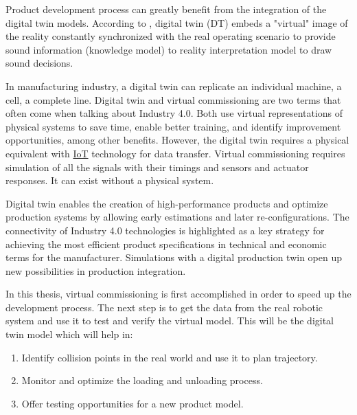 

Product development process can greatly benefit from the integration of
the digital twin models. According to \cite{SEMERARO2021103469}, digital twin (DT) embeds a "virtual" image of the reality
constantly synchronized with the real operating scenario to provide sound information (knowledge model) to reality interpretation model to draw sound decisions.

In manufacturing industry, a digital twin can replicate an individual machine, a cell, a complete line. Digital twin and virtual commissioning are two terms that often come when
talking about Industry 4.0. Both use virtual representations of physical systems to save time, enable better training, and identify improvement opportunities, among other benefits. However, the digital twin requires a physical equivalent with \hyperref[tab:acronyms]{IoT} technology for data transfer. Virtual commissioning requires simulation of all the signals with their timings and sensors and actuator responses.
It can exist without a physical system. \cite{digitaltwinblog}

Digital twin enables the creation of high-performance products and optimize production systems by allowing early estimations and later re-configurations. The connectivity of Industry 4.0 technologies is highlighted as a key strategy for achieving the most efficient product specifications in technical and economic terms for the manufacturer. 
Simulations with a digital production twin open up new possibilities in production integration.
\cite{WAGNER201988}


In this thesis, virtual commissioning is first accomplished in order to speed up the development process. The next step is to get the data from the real robotic system and use it to test and verify the virtual model.
This will be the digital twin model which will help in:
\begin{enumerate}
    \item Identify collision points in the real world and use it to plan trajectory.
    \item Monitor and optimize the loading and unloading process.
    \item Offer testing opportunities for a new product model.
\end{enumerate}

